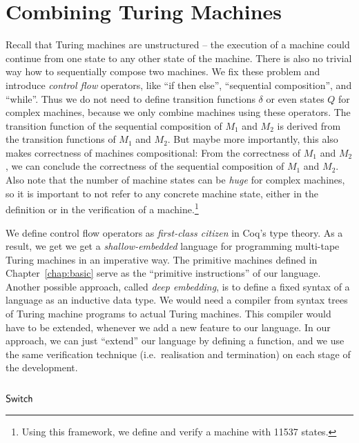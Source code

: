 \chapter{Combining Turing Machines}
\label{chap:combining}

Recall that Turing machines are unstructured -- the execution of a machine could continue from one state to any other state of the machine.  There is
also no trivial way how to sequentially compose two machines.  We fix these problem and introduce \textit{control flow} operators, like ``if then
else'', ``sequential composition'', and ``while''.  Thus we do not need to define transition functions $\delta$ or even states $Q$ for complex
machines, because we only combine machines using these operators.  The transition function of the sequential composition of $M_1$ and $M_2$ is derived
from the transition functions of $M_1$ and $M_2$.  But maybe more importantly, this also makes correctness of machines compositional: From the
correctness of $M_1$ and $M_2$, we can conclude the correctness of the sequential composition of $M_1$ and $M_2$.  Also note that the number of
machine states can be \textit{huge} for complex machines, so it is important to not refer to any concrete machine state, either in the definition or
in the verification of a machine.\footnote{Using this framework, we define and verify a machine with 11537 states.}

We define control flow operators as \textit{first-class citizen} in Coq's type theory.  As a result, we get we get a \textit{shallow-embedded}
language for programming multi-tape Turing machines in an imperative way.  The primitive machines defined in Chapter~\ref{chap:basic} serve as the
``primitive instructions'' of our language.  Another possible approach, called \textit{deep embedding}, is to define a fixed syntax of a language as
an inductive data type.  We would need a compiler from syntax trees of Turing machine programs to actual Turing machines.  This compiler would have to
be extended, whenever we add a new feature to our language.  In our approach, we can just ``extend'' our language by defining a function, and we use
the same verification technique (i.e.\ realisation and termination) on each stage of the development.


\section{$\mathsf{Switch}$}
\label{sec:switch}


